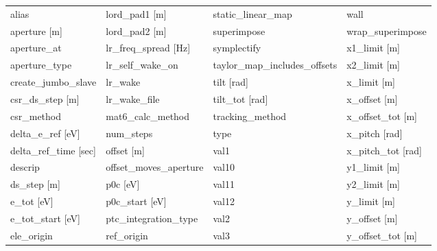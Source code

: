 \begin{tabular}{llll} \toprule
alias                            & lord_pad1 [m]                    & static_linear_map                & wall                             \\
aperture [m]                     & lord_pad2 [m]                    & superimpose                      & wrap_superimpose                 \\
aperture_at                      & lr_freq_spread [Hz]              & symplectify                      & x1_limit [m]                     \\
aperture_type                    & lr_self_wake_on                  & taylor_map_includes_offsets      & x2_limit [m]                     \\
create_jumbo_slave               & lr_wake                          & tilt [rad]                       & x_limit [m]                      \\
csr_ds_step [m]                  & lr_wake_file                     & tilt_tot [rad]                   & x_offset [m]                     \\
csr_method                       & mat6_calc_method                 & tracking_method                  & x_offset_tot [m]                 \\
delta_e_ref [eV]                 & num_steps                        & type                             & x_pitch [rad]                    \\
delta_ref_time [sec]             & offset [m]                       & val1                             & x_pitch_tot [rad]                \\
descrip                          & offset_moves_aperture            & val10                            & y1_limit [m]                     \\
ds_step [m]                      & p0c [eV]                         & val11                            & y2_limit [m]                     \\
e_tot [eV]                       & p0c_start [eV]                   & val12                            & y_limit [m]                      \\
e_tot_start [eV]                 & ptc_integration_type             & val2                             & y_offset [m]                     \\
ele_origin                       & ref_origin                       & val3                             & y_offset_tot [m]                 \\

\end{tabular}
